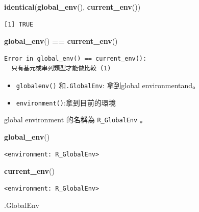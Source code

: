 \documentclass[]{book}
\newenvironment{Shaded}{\begin{snugshade}}{\end{snugshade}}
\newcommand{\KeywordTok}[1]{\textcolor[rgb]{0.13,0.29,0.53}{\textbf{#1}}}
\newcommand{\NormalTok}[1]{#1}
\newcommand{\OperatorTok}[1]{\textcolor[rgb]{0.81,0.36,0.00}{\textbf{#1}}}
\newcommand{\StringTok}[1]{\textcolor[rgb]{0.31,0.60,0.02}{#1}}
\providecommand{\tightlist}{%
  \setlength{\itemsep}{0pt}\setlength{\parskip}{0pt}}
\theoremstyle{definition}
\theoremstyle{definition}
\theoremstyle{definition}
\theoremstyle{remark}
\begin{document}
\begin{Shaded}
\begin{Highlighting}[]
\KeywordTok{identical}\NormalTok{(}\KeywordTok{global_env}\NormalTok{(), }\KeywordTok{current_env}\NormalTok{())}
\end{Highlighting}
\end{Shaded}

\begin{verbatim}
[1] TRUE
\end{verbatim}

\begin{Shaded}
\begin{Highlighting}[]
\KeywordTok{global_env}\NormalTok{() }\OperatorTok{==}\StringTok{ }\KeywordTok{current_env}\NormalTok{()}
\end{Highlighting}
\end{Shaded}

\begin{verbatim}
Error in global_env() == current_env():
  只有基元或串列類型才能做比較 (1)
\end{verbatim}

\begin{itemize}
\tightlist
\item
  \texttt{globalenv()} 和\texttt{.GlobalEnv}: 拿到global
  environmentand。
\item
  \texttt{environment()}:拿到目前的環境
\end{itemize}

global environment 的名稱為 \texttt{R\_GlobalEnv} 。

\begin{Shaded}
\begin{Highlighting}[]
\KeywordTok{global_env}\NormalTok{()}
\end{Highlighting}
\end{Shaded}

\begin{verbatim}
<environment: R_GlobalEnv>
\end{verbatim}

\begin{Shaded}
\begin{Highlighting}[]
\KeywordTok{current_env}\NormalTok{()}
\end{Highlighting}
\end{Shaded}

\begin{verbatim}
<environment: R_GlobalEnv>
\end{verbatim}

\begin{Shaded}
\begin{Highlighting}[]
\NormalTok{.GlobalEnv}
\end{Highlighting}
\end{Shaded}
\end{document}
